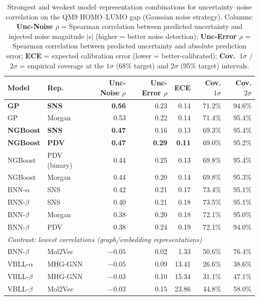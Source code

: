 \documentclass[pdflatex,sn-basic]{sn-jnl}%
\theoremstyle{thmstyleone}%
\theoremstyle{thmstyletwo}%
\theoremstyle{thmstylethree}%
\begin{document}
\begin{table}[htbp]
\centering
\caption{Strongest and weakest model--representation combinations for uncertainty--noise correlation on the QM9 HOMO--LUMO gap (Gaussian noise strategy). Columns: \textbf{Unc-Noise $\rho$} = Spearman correlation between predicted uncertainty and injected noise magnitude $|\epsilon|$ (higher = better noise detection); \textbf{Unc-Error $\rho$} = Spearman correlation between predicted uncertainty and absolute prediction error; \textbf{ECE} = expected calibration error (lower = better-calibrated); \textbf{Cov.\ $1\sigma$} / \textbf{$2\sigma$} = empirical coverage at the $1\sigma$ (68\% target) and $2\sigma$ (95\% target) intervals.}
\label{tab:top_unc_noise}
\small
\begin{tabular}{llrrrrr}
\toprule
\textbf{Model} & \textbf{Rep.} & \textbf{Unc-Noise $\rho$} & \textbf{Unc-Error $\rho$} & \textbf{ECE} & \textbf{Cov. $1\sigma$} & \textbf{Cov. $2\sigma$} \\
\midrule
\textbf{GP}    & \textbf{SNS}    & \textbf{0.56} & 0.23 & 0.14 & 71.2\% & 94.6\% \\
GP             & Morgan          & 0.53 & 0.22 & 0.14 & 71.4\% & 95.4\% \\
\textbf{NGBoost} & \textbf{SNS}  & \textbf{0.47} & 0.16 & 0.13 & 69.3\% & 95.4\% \\
\textbf{NGBoost} & \textbf{PDV}  & \textbf{0.47} & \textbf{0.29} & \textbf{0.11} & 69.0\% & 95.2\% \\
NGBoost        & PDV (binary)    & 0.44 & 0.25 & 0.13 & 69.8\% & 95.4\% \\
NGBoost        & Morgan          & 0.44 & 0.20 & 0.14 & 69.8\% & 95.3\% \\
BNN-$\alpha$   & SNS             & 0.42 & 0.21 & 0.17 & 73.4\% & 95.1\% \\
BNN-$\beta$    & SNS             & 0.40 & 0.21 & 0.18 & 73.5\% & 95.1\% \\
BNN-$\beta$    & Morgan          & 0.38 & 0.20 & 0.18 & 72.1\% & 95.0\% \\
BNN-$\beta$    & PDV             & 0.38 & 0.24 & 0.19 & 72.1\% & 94.0\% \\
\midrule
\multicolumn{7}{l}{\textit{Contrast: lowest correlations (graph/embedding representations)}} \\
\midrule
BNN-$\beta$ & Mol2Vec & $-0.05$ & 0.02 & 1.33 & 50.6\% & 76.4\% \\
VBLL-$\alpha$ & MHG-GNN & $-0.05$ & 0.09 & 13.41 & 26.6\% & 38.6\% \\
VBLL-$\beta$ & MHG-GNN & $-0.03$ & 0.10 & 15.34 & 31.1\% & 47.1\% \\
VBLL-$\beta$ & Mol2Vec & $-0.03$ & 0.15 & 23.86 & 44.8\% & 58.0\% \\
\bottomrule
\end{tabular}
\end{table}
\end{document}
